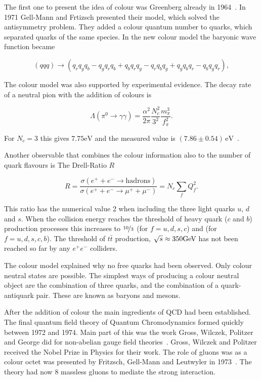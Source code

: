 The first one to present the idea of colour was Greenberg already in 1964~\cite{Greenberg:1964}. In 1971 Gell-Mann and Frtizsch presented their model, which solved the antisymmetry problem. They added a colour quantum number to quarks, which separated quarks of the same species. In the new colour model the baryonic wave function became

\begin{equation}
\left( qqq\right)\rightarrow\left(q_rq_gq_b-q_gq_rq_b+q_bq_rq_g-q_rq_bq_g+q_gq_bq_r-q_bq_gq_r\right),
\end{equation}

The colour model was also supported by experimental evidence. The decay rate of a neutral pion with the addition of colours is

\begin{equation}
\Lambda\left(\pi^0\rightarrow\gamma \gamma\right) = \frac{\alpha^2}{2\pi}\frac{N_c^2}{3^2}\frac{m_\pi^3}{f_\pi^2}.
\end{equation} 

\noindent For $N_c=3$ this gives $7.75 \mathrm{eV}$ and the measured value is $(7.86\pm0.54)\,\mathrm{eV}$~\cite{Williams:1988sg}.

Another observable that combines the colour information also to the number of quark flavours is The Drell-Ratio $R$~\cite{Krolikowski:1974jx}

\begin{equation}
R=\frac{\sigma\left(e^++e^-\rightarrow\mathrm{hadrons}\right)}{\sigma\left(e^++e^-\rightarrow\mu^++\mu^-\right)}=N_c\sum_fQ_f^2.
\end{equation}

\noindent This ratio has the numerical value 2 when including the three light quarks $u$, $d$ and $s$. When the collision energy reaches the threshold of heavy quark ($c$ and $b$) production processes this increases to $\nicefrac{10}{3}$ (for $f=u,d,s,c$) and  (for $f=u,d,s,c,b$). The threshold of $t\bar t$ production, $\sqrt{s}\approx350\mathrm{GeV}\kern-0.05em$ has not been reached so far by any $e^+e^-$ colliders.

The colour model explained why no free quarks had been observed. Only colour neutral states are possible. The simplest ways of producing a colour neutral object are the combination of three quarks, and the combination of a quark-antiquark pair. These are known as baryons and mesons.

After the addition of colour the main ingredients of QCD had been established. The final quantum field theory of Quantum Chromodynamics formed quickly between 1972 and 1974. Main part of this was the work Gross, Wilczek, Politzer and George did for non-abelian gauge field theories~\cite{gross1973ultraviolet, politzer1973reliable, gross1973asymptotically, gross1974asymptotically, georgi1974electroproduction}. Gross, Wilczek and Politzer received the Nobel Prize in Physics for their work. The role of gluons was as a colour octet was presented by Fritzsch, Gell-Mann and Leutwyler in 1973~\cite{fritzsch1973advantages}. The theory had now 8 massless gluons to mediate the strong interaction.

